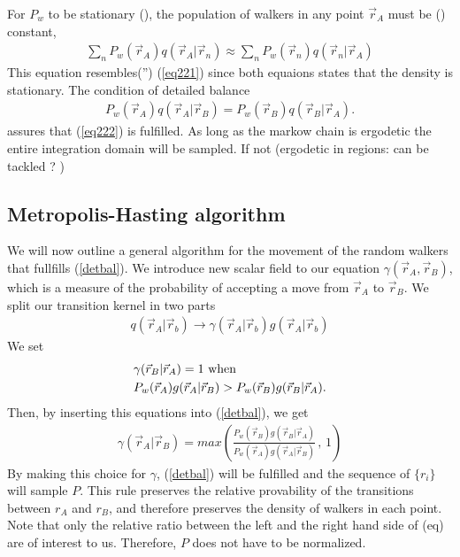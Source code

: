 \documentclass[a4paper,10pt,twocolumn]{article} %
\begin{document}
For $P_w$ to be stationary (), the population of walkers in any point $\vec r_A$ must be () constant,
\begin{align}
	\sum_n P_w(\vec r_A) q(\vec r_A|\vec r_n)  \approx	\sum_n P_w(\vec r_n) q(\vec r_n|\vec r_A) \label{eq222}
\end{align} 
This equation resembles('') (\ref{eq221}) since both equaions states that the density is stationary.
The condition of detailed balance
\begin{align}
    P_w(\vec r_A) q(\vec r_A|\vec r_B)  =  P_w(\vec r_B) q(\vec r_B|\vec r_A).\label{detbal}
\end{align}
assures that (\ref{eq222}) is fulfilled. 
As long as the markow chain is ergodetic the entire integration domain will be sampled.
If not (ergodetic in regions: can be tackled ? )

\subsection{Metropolis-Hasting algorithm}%
We will now outline a general algorithm for the movement of the random walkers that fullfills (\ref{detbal}).
We introduce new scalar field to our equation $\gamma(\vec r_A,\vec r_B)$, which is a measure of the 
probability of accepting a move from $\vec r_A$ to $\vec r_B$.
We split our transition kernel in two parts
\begin{align}
	q(\vec r_A|\vec r_b) 
		\to 
	\gamma(\vec r_A|\vec r_b)
	g(\vec r_A|\vec r_b)
\end{align} 
We set 
\begin{align}
&\gamma(\vec r_B|\vec r_A)=1 \text{ when }\notag\\
    &P_w(\vec r_A) g(\vec r_A|\vec r_B)  >  P_w(\vec r_B) g(\vec r_B|\vec r_A).
\end{align}
Then, by inserting this equations into (\ref{detbal}), we get
\begin{align} 
	\gamma(\vec r_A|\vec r_B)=max\left(
	\frac
	{P_w(\vec r_B) g(\vec r_B|\vec r_A)}
    {P_w(\vec r_A) g(\vec r_A|\vec r_B)}\, 
	,\, 1 \right)
\end{align}
By making this choice for $\gamma$, (\ref{detbal}) will be fulfilled and the sequence of $\{r_i\}$ will sample 
$P$. This rule preserves the relative provability of the transitions between $r_A$ and $r_B$, and therefore preserves the 
density of walkers in each point.  Note that only the relative ratio between the left and the right hand side of (eq) are of interest to us. Therefore, $P$ does not have to be normalized. 
\end{document}
